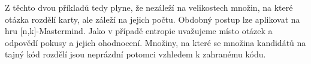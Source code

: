 Z těchto dvou příkladů tedy plyne, že nezáleží na velikostech množin, na které otázka rozdělí karty, ale záleží na jejich počtu. Obdobný postup lze aplikovat na hru [n,k]-Mastermind. Jako v případě entropie uvažujeme místo otázek a odpovědí pokusy a jejich ohodnocení. Množiny, na které se množina kandidátů na tajný kód rozdělí jsou neprázdní potomci vzhledem k zahranému kódu. 











